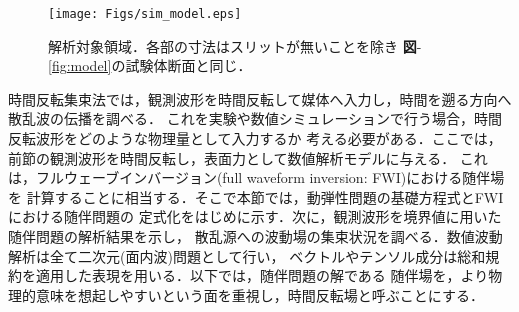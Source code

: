 ﻿\begin{figure}[bth]
\centering
	\texttt{[image: Figs/sim\_model.eps]}
	\caption{解析対象領域．各部の寸法はスリットが無いことを除き
	{\bf 図}-\ref{fig:model}の試験体断面と同じ．}
	\label{fig:fd_model}
\end{figure}
時間反転集束法では，観測波形を時間反転して媒体へ入力し，時間を遡る方向へ散乱波の伝播を調べる．
これを実験や数値シミュレーションで行う場合，時間反転波形をどのような物理量として入力するか
考える必要がある．ここでは，前節の観測波形を時間反転し，表面力として数値解析モデルに与える．
これは，フルウェーブインバージョン(full waveform inversion: FWI)における随伴場を
計算することに相当する．そこで本節では，動弾性問題の基礎方程式とFWIにおける随伴問題の
定式化をはじめに示す．次に，観測波形を境界値に用いた随伴問題の解析結果を示し，
散乱源への波動場の集束状況を調べる．数値波動解析は全て二次元(面内波)問題として行い，
ベクトルやテンソル成分は総和規約を適用した表現を用いる．以下では，随伴問題の解である
随伴場を，より物理的意味を想起しやすいという面を重視し，時間反転場と呼ぶことにする．
